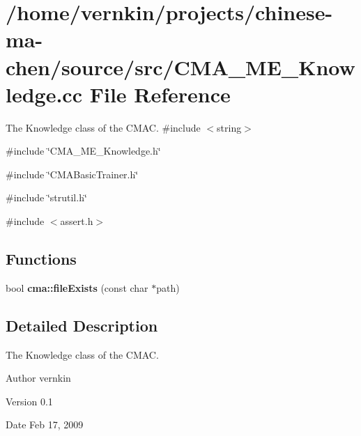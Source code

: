 \section{/home/vernkin/projects/chinese-\/ma-\/chen/source/src/CMA\_\-ME\_\-Knowledge.cc File Reference}
\label{CMA__ME__Knowledge_8cc}


The Knowledge class of the CMAC.  
{\ttfamily \#include $<$string$>$}\par
{\ttfamily \#include \char`\"{}CMA\_\-ME\_\-Knowledge.h\char`\"{}}\par
{\ttfamily \#include \char`\"{}CMABasicTrainer.h\char`\"{}}\par
{\ttfamily \#include \char`\"{}strutil.h\char`\"{}}\par
{\ttfamily \#include $<$assert.h$>$}\par
\subsection*{Functions}
\begin{DoxyCompactItemize}
\item 
bool {\bfseries cma::fileExists} (const char $\ast$path)\label{namespacecma_ab1851cbc3cd9a0183ff1d20a8732cf9a}

\end{DoxyCompactItemize}


\subsection{Detailed Description}
The Knowledge class of the CMAC. \begin{DoxyAuthor}{Author}
vernkin 
\end{DoxyAuthor}
\begin{DoxyVersion}{Version}
0.1 
\end{DoxyVersion}
\begin{DoxyDate}{Date}
Feb 17, 2009 
\end{DoxyDate}
